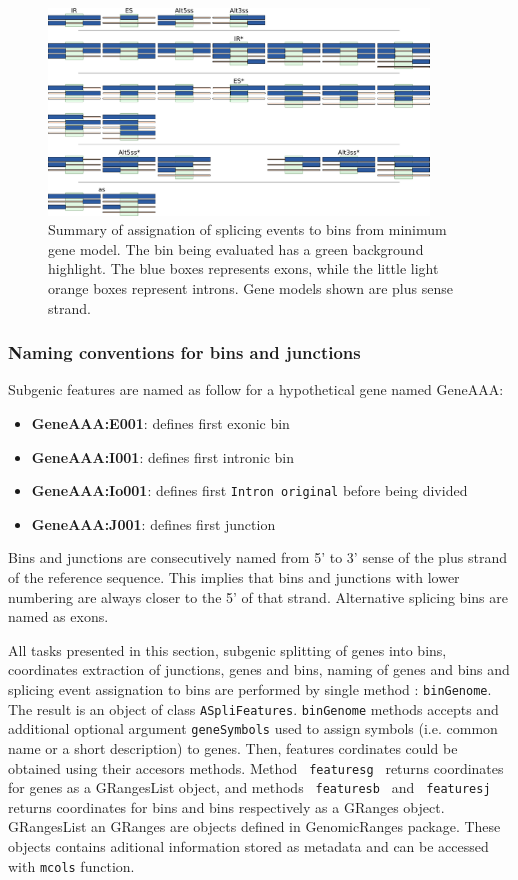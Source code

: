 \documentclass{article}
\begin{document}
\begin{figure}[ht!]
\centering
\includegraphics[width=0.9\textwidth]{images/event_assignment.pdf}
\caption{ Summary of assignation of splicing events to bins from minimum gene
model. The bin being evaluated has a green background highlight. The blue boxes
represents exons, while the little light orange boxes represent introns. Gene
models shown are plus sense strand. }
\label{fig:binAssignation}
\end{figure}



\subsubsection{ Naming conventions for bins and junctions }
\label{sec:binNaming}
Subgenic features are named as follow for a hypothetical gene named GeneAAA:
\begin{itemize}
  \item \textbf{GeneAAA:E001}: defines first exonic bin
  \item \textbf{GeneAAA:I001}: defines first intronic bin
  \item \textbf{GeneAAA:Io001}: defines first \texttt{Intron original} before 
  being divided
  \item \textbf{GeneAAA:J001}: defines first junction
\end{itemize}

Bins and junctions are consecutively named from 5' to 3' sense of the plus
strand of the reference sequence. This implies that  bins and junctions with
lower numbering are always closer to the 5' of that strand. Alternative splicing
bins are named as exons.

All tasks presented in this section, subgenic splitting of genes into
bins, coordinates extraction of junctions, genes and bins, naming of genes and
bins and splicing event assignation to bins are performed by single method
: \texttt{binGenome}. The result is an object of class \texttt{ASpliFeatures}.
\texttt{binGenome} methods accepts and additional optional argument
\texttt{geneSymbols} used to assign symbols (i.e. common name or a short
description) to genes.
Then, features cordinates could be obtained using their accesors methods.
Method \texttt{ featuresg } returns coordinates for genes as a GRangesList
object, and methods \texttt{ featuresb } and \texttt{ featuresj } returns
coordinates for bins and bins respectively as a GRanges object. GRangesList an
GRanges are objects defined in GenomicRanges package. These objects contains
aditional information stored as metadata and can be accessed with \texttt{mcols}
function.
\end{document}
